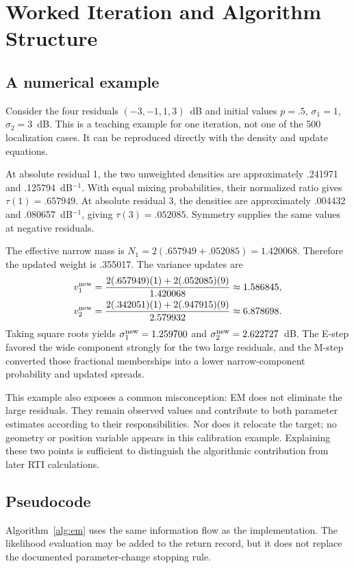 \documentclass[conference,letterpaper]{IEEEtran}
\begin{document}
\section{Worked Iteration and Algorithm Structure}
\subsection{A numerical example}
Consider the four residuals $(-3,-1,1,3)$~dB and initial values $p=.5$, $\sigma_1=1$, $\sigma_2=3$~dB. This is a teaching example for one iteration, not one of the 500 localization cases. It can be reproduced directly with the density and update equations.

At absolute residual 1, the two unweighted densities are approximately .241971 and .125794~dB$^{-1}$. With equal mixing probabilities, their normalized ratio gives $\tau(1)=.657949$. At absolute residual 3, the densities are approximately .004432 and .080657~dB$^{-1}$, giving $\tau(3)=.052085$. Symmetry supplies the same values at negative residuals.

The effective narrow mass is $N_1=2(.657949+.052085)=1.420068$. Therefore the updated weight is .355017. The variance updates are
\begin{align}
v_1^{\rm new}&=\frac{2(.657949)(1)+2(.052085)(9)}{1.420068}
\approx1.586845,\\
v_2^{\rm new}&=\frac{2(.342051)(1)+2(.947915)(9)}{2.579932}
\approx6.878698.
\end{align}
Taking square roots yields $\sigma_1^{\rm new}=1.259700$ and $\sigma_2^{\rm new}=2.622727$~dB. The E-step favored the wide component strongly for the two large residuals, and the M-step converted those fractional memberships into a lower narrow-component probability and updated spreads.

This example also exposes a common misconception: EM does not eliminate the large residuals. They remain observed values and contribute to both parameter estimates according to their responsibilities. Nor does it relocate the target; no geometry or position variable appears in this calibration example. Explaining these two points is sufficient to distinguish the algorithmic contribution from later RTI calculations.

\subsection{Pseudocode}
Algorithm~\ref{alg:em} uses the same information flow as the implementation. The likelihood evaluation may be added to the return record, but it does not replace the documented parameter-change stopping rule.
\end{document}
